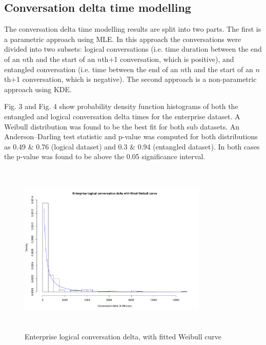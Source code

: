 \documentclass[conference]{IEEEtran}
\begin{document}
\subsection{Conversation delta time modelling}

The conversation delta time modelling results are split into two parts. The first is a parametric approach using MLE. In this approach the conversations were divided into two subsets: logical conversations (i.e. time duration between the end of an $n$th and the start of an $n$th+1 conversation, which is positive), and entangled conversation (i.e. time between the end of an $n$th and the start of an $n$th+1 conversation, which is negative). The second approach is a non-parametric approach using KDE.

Fig. 3 and Fig. 4 show probability density function histograms of both the entangled and logical conversation delta times for the enterprise dataset.  A Weibull distribution was found to be the best fit for both sub datasets.  An Anderson--Darling test statistic and p-value was computed for both distributions as 0.49 \& 0.76 (logical dataset) and 0.3 \& 0.94 (entangled dataset). In both cases the p-value was found to be above the 0.05 significance interval.

\begin{figure}
\begin{center}
\includegraphics[height=8.3cm, width=9cm]{03_delta_logical_enterprise.pdf} 
\caption{Enterprise logical conversation delta, with fitted Weibull curve}
\end{center}
\label{fig:delta_log_ent}
\end{figure}
\end{document}
